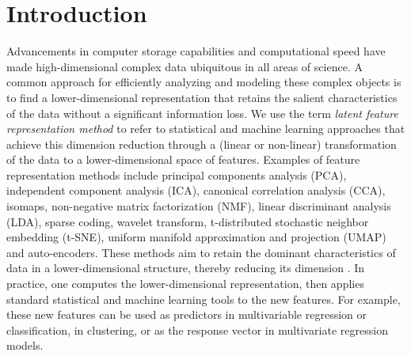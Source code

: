 \section{Introduction}

Advancements in computer storage capabilities and computational speed have made high-dimensional complex data ubiquitous in all areas of science. A common approach for efficiently analyzing and modeling these complex objects is to find a lower-dimensional representation that retains the salient characteristics of the data without a significant information loss.
We use the term \emph{latent feature representation method} to refer to statistical and machine learning approaches that achieve this dimension reduction through a (linear or non-linear) transformation of the data to a lower-dimensional space of features.
Examples of feature representation methods include principal components analysis (PCA), independent component analysis (ICA), canonical correlation analysis (CCA), isomaps, non-negative matrix factorization (NMF), linear discriminant analysis (LDA), sparse coding, wavelet transform, t-distributed stochastic neighbor embedding (t-SNE), uniform manifold approximation and projection (UMAP) and auto-encoders. 
These methods aim to retain the dominant characteristics of data in a lower-dimensional structure, thereby reducing its dimension . 
In practice, one computes the lower-dimensional representation, then applies standard statistical and machine learning tools to the new features. 
For example, these new features can be used as predictors in multivariable regression or classification, in clustering, or as the response vector in multivariate regression models.

